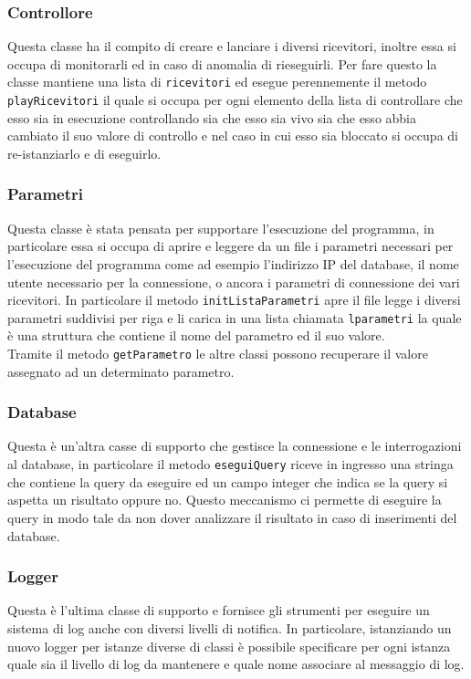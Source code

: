 \subsubsection{Controllore}
Questa classe ha il compito di creare e lanciare i diversi ricevitori, inoltre essa si occupa di monitorarli ed in caso di anomalia di rieseguirli. Per fare questo la classe mantiene una lista di \texttt{ricevitori} ed esegue perennemente il metodo \texttt{playRicevitori} il quale si occupa per ogni elemento della lista di controllare che esso sia in esecuzione controllando sia che esso sia vivo sia che esso abbia cambiato il suo valore di controllo e nel caso in cui esso sia bloccato si occupa di re-istanziarlo e di eseguirlo.
\subsubsection{Parametri}
Questa classe è stata pensata per supportare l'esecuzione del programma, in particolare essa si occupa di aprire e leggere da un file i parametri necessari per l'esecuzione del programma come ad esempio l'indirizzo IP del database, il nome utente necessario per la connessione, o ancora i parametri di connessione dei vari ricevitori. In particolare il metodo \texttt{initListaParametri} apre il file legge i diversi parametri suddivisi per riga e li carica in una lista chiamata \texttt{lparametri} la quale è una struttura che contiene il nome del parametro ed il suo valore.\\
Tramite il metodo \texttt{getParametro} le altre classi possono recuperare il valore assegnato ad un determinato parametro.
\subsubsection{Database}
Questa è un'altra casse di supporto che gestisce la connessione e le interrogazioni al database, in particolare il metodo \texttt{eseguiQuery} riceve in ingresso una stringa che contiene la query da eseguire ed un campo integer che indica se la query si aspetta un risultato oppure no. Questo meccanismo ci permette di eseguire la query in modo tale da non dover analizzare il risultato in caso di inserimenti del database.
\subsubsection{Logger}
Questa è l'ultima classe di supporto e fornisce gli strumenti per eseguire un sistema di log anche con diversi livelli di notifica. In particolare, istanziando un nuovo logger per istanze diverse di classi è possibile specificare per ogni istanza quale sia il livello di log da mantenere e quale nome associare al messaggio di log.
